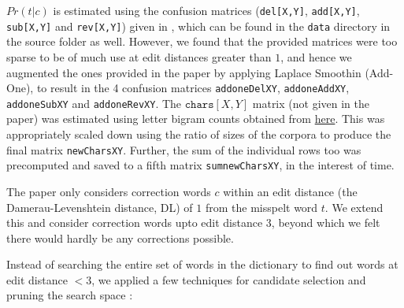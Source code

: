 $Pr(t|c)$ is estimated using the confusion matrices (\texttt{del[X,Y]}, \texttt{add[X,Y]}, \texttt{sub[X,Y]} and \texttt{rev[X,Y]}) given in \cite{kern}, which can be found in the \texttt{data} directory in the source folder as well. However, we found that the provided matrices were too sparse to be of much use at edit distances greater than $1$, and hence we augmented the ones provided in the paper by applying Laplace Smoothin (Add-One), to result in the 4 confusion matrices \texttt{addoneDelXY}, \texttt{addoneAddXY}, \texttt{addoneSubXY} and \texttt{addoneRevXY}.
The $\texttt{chars}[X,Y]$ matrix (not given in the paper) was estimated using letter bigram counts obtained from \href{http://norvig.com/ngrams/}{here}. This was appropriately scaled down using the ratio of sizes of the corpora to produce the final matrix \texttt{newCharsXY}. Further, the sum of the individual rows too was precomputed and saved to a fifth matrix \texttt{sumnewCharsXY}, in the interest of time.

The paper only considers correction words $c$ within an edit distance (the Damerau-Levenshtein distance, DL) of $1$ from the misspelt word $t$.
We extend this and consider correction words upto edit distance 3, beyond which we felt there would hardly be any corrections possible.

Instead of searching the entire set of words in the dictionary to find out words at edit distance $< 3$, we applied a few techniques for candidate selection and pruning the search space :

